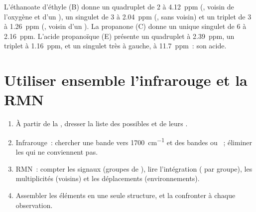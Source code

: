 \begin{example}\label{ex:g12:proton-nmr:reading}
L'éthanoate d'éthyle (B) donne un quadruplet de 2  à
\qty{4.12}{ppm} (, voisin de l'oxygène et d'un ), un
singulet de 3  à
\qty{2.04}{ppm} (, sans  voisin) et un triplet de 3
 à \qty{1.26}{ppm} (, voisin d'un ). La propanone
(C) donne un unique singulet de 6  à \qty{2.16}{ppm}. L'acide
propanoïque (E) présente un quadruplet à \qty{2.39}{ppm}, un triplet à
\qty{1.16}{ppm}, et un singulet très à gauche, à \qty{11.7}{ppm}~: son
 acide.
\end{example}

\section{Utiliser ensemble l'infrarouge et la RMN}


\begin{method}\label{met:g12:proton-nmr:identify}
\begin{enumerate}
  \item À partir de la , dresser la liste des 
        possibles et de leurs .
  \item Infrarouge~: chercher une bande  vers \qty{1700}{cm^{-1}}
        et des bandes  ou ~; éliminer les  qui ne
        conviennent pas.
  \item RMN~: compter les signaux (groupes de ), lire
        l'intégration ( par groupe), les multiplicités (voisins)
        et les déplacements (environnements).
  \item Assembler les éléments en une seule structure, et la confronter à
        chaque observation.
\end{enumerate}
\end{method}

